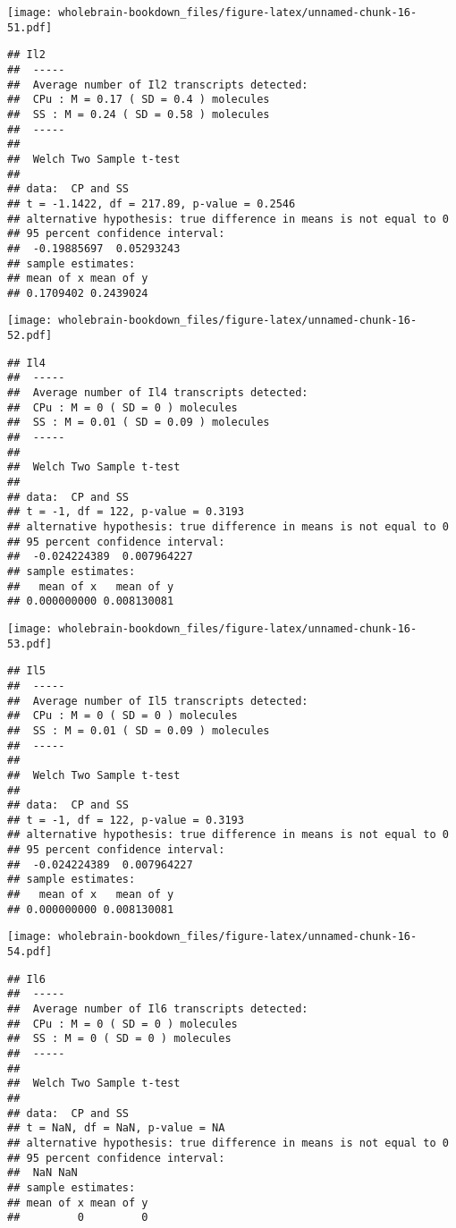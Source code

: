 \documentclass[]{book}
\theoremstyle{definition}
\theoremstyle{definition}
\theoremstyle{remark}
\begin{document}
\texttt{[image: wholebrain-bookdown\_files/figure-latex/unnamed-chunk-16-51.pdf]}

\begin{verbatim}
## Il2
##  -----
##  Average number of Il2 transcripts detected:
##  CPu : M = 0.17 ( SD = 0.4 ) molecules 
##  SS : M = 0.24 ( SD = 0.58 ) molecules
##  -----
## 
##  Welch Two Sample t-test
## 
## data:  CP and SS
## t = -1.1422, df = 217.89, p-value = 0.2546
## alternative hypothesis: true difference in means is not equal to 0
## 95 percent confidence interval:
##  -0.19885697  0.05293243
## sample estimates:
## mean of x mean of y 
## 0.1709402 0.2439024
\end{verbatim}

\texttt{[image: wholebrain-bookdown\_files/figure-latex/unnamed-chunk-16-52.pdf]}

\begin{verbatim}
## Il4
##  -----
##  Average number of Il4 transcripts detected:
##  CPu : M = 0 ( SD = 0 ) molecules 
##  SS : M = 0.01 ( SD = 0.09 ) molecules
##  -----
## 
##  Welch Two Sample t-test
## 
## data:  CP and SS
## t = -1, df = 122, p-value = 0.3193
## alternative hypothesis: true difference in means is not equal to 0
## 95 percent confidence interval:
##  -0.024224389  0.007964227
## sample estimates:
##   mean of x   mean of y 
## 0.000000000 0.008130081
\end{verbatim}

\texttt{[image: wholebrain-bookdown\_files/figure-latex/unnamed-chunk-16-53.pdf]}

\begin{verbatim}
## Il5
##  -----
##  Average number of Il5 transcripts detected:
##  CPu : M = 0 ( SD = 0 ) molecules 
##  SS : M = 0.01 ( SD = 0.09 ) molecules
##  -----
## 
##  Welch Two Sample t-test
## 
## data:  CP and SS
## t = -1, df = 122, p-value = 0.3193
## alternative hypothesis: true difference in means is not equal to 0
## 95 percent confidence interval:
##  -0.024224389  0.007964227
## sample estimates:
##   mean of x   mean of y 
## 0.000000000 0.008130081
\end{verbatim}

\texttt{[image: wholebrain-bookdown\_files/figure-latex/unnamed-chunk-16-54.pdf]}

\begin{verbatim}
## Il6
##  -----
##  Average number of Il6 transcripts detected:
##  CPu : M = 0 ( SD = 0 ) molecules 
##  SS : M = 0 ( SD = 0 ) molecules
##  -----
## 
##  Welch Two Sample t-test
## 
## data:  CP and SS
## t = NaN, df = NaN, p-value = NA
## alternative hypothesis: true difference in means is not equal to 0
## 95 percent confidence interval:
##  NaN NaN
## sample estimates:
## mean of x mean of y 
##         0         0
\end{verbatim}
\end{document}
